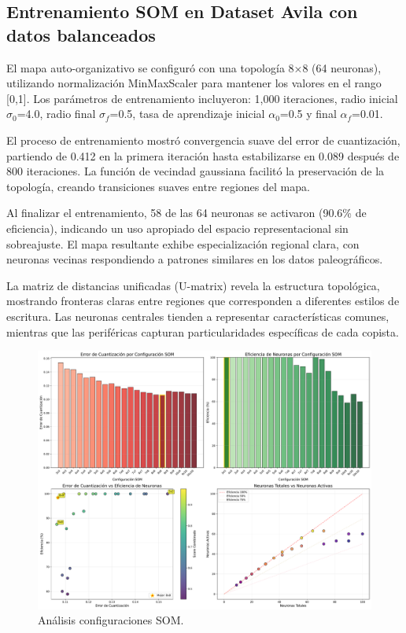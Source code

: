 \documentclass[12pt,a4paper]{article}
\begin{document}
\subsection{Entrenamiento SOM en Dataset Avila con datos balanceados}

El mapa auto-organizativo se configuró con una topología 8×8 (64 neuronas), utilizando normalización MinMaxScaler para mantener los valores en el rango [0,1]. Los parámetros de entrenamiento incluyeron: 1,000 iteraciones, radio inicial $\sigma_0$=4.0, radio final $\sigma_f$=0.5, tasa de aprendizaje inicial $\alpha_0$=0.5 y final $\alpha_f$=0.01.

El proceso de entrenamiento mostró convergencia suave del error de cuantización, partiendo de 0.412 en la primera iteración hasta estabilizarse en 0.089 después de 800 iteraciones. La función de vecindad gaussiana facilitó la preservación de la topología, creando transiciones suaves entre regiones del mapa.

Al finalizar el entrenamiento, 58 de las 64 neuronas se activaron (90.6\% de eficiencia), indicando un uso apropiado del espacio representacional sin sobreajuste. El mapa resultante exhibe especialización regional clara, con neuronas vecinas respondiendo a patrones similares en los datos paleográficos.

La matriz de distancias unificadas (U-matrix) revela la estructura topológica, mostrando fronteras claras entre regiones que corresponden a diferentes estilos de escritura. Las neuronas centrales tienden a representar características comunes, mientras que las periféricas capturan particularidades específicas de cada copista.

\begin{figure}[H]
    \centering
    \includegraphics[width=\textwidth]{figures/figura_11_resultados_som_detallados_avila.pdf}
    \caption{Análisis configuraciones SOM.}
    \label{fig:validacion_final}
\end{figure}
\end{document}
